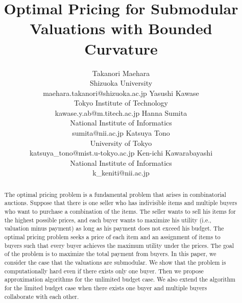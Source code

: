 \documentclass[letterpaper]{article}
\theoremstyle{definition}
\begin{document}
\title{Optimal Pricing for Submodular Valuations with Bounded Curvature}
\author{
Takanori Maehara\\
Shizuoka University \\
maehara.takanori@shizuoka.ac.jp
\And
Yasushi Kawase \\
Tokyo Institute of Technology \\
kawase.y.ab@m.titech.ac.jp
\AND
Hanna Sumita \\
National Institute of Informatics \\
sumita@nii.ac.jp
\And
Katsuya Tono \\
University of Tokyo \\
katsuya\_tono@mist.u-tokyo.ac.jp
\And
Ken-ichi Kawarabayashi \\
National Institute of Informatics \\
k\_keniti@nii.ac.jp
}
\nocopyright
\maketitle

\begin{abstract}
The optimal pricing problem is a fundamental problem that arises in combinatorial auctions.
Suppose that there is one seller who has indivisible items and multiple buyers who want to purchase a combination of the items.
The seller wants to sell his items for the highest possible prices,
and each buyer wants to maximize his utility (i.e., valuation minus payment) as long as his payment does not exceed his budget. 
The optimal pricing problem seeks a price of each item and an assignment of items to buyers such that every buyer achieves the maximum utility under the prices. 
The goal of the problem is to maximize the total payment from buyers. 
In this paper, we consider the case that the valuations are submodular. 
We show that the problem is computationally hard even if there exists only one buyer. 
Then we propose approximation algorithms for the unlimited budget case. 
We also extend the algorithm for the limited budget case when there exists one buyer and multiple buyers collaborate with each other. 
\end{abstract} 
\end{document}
